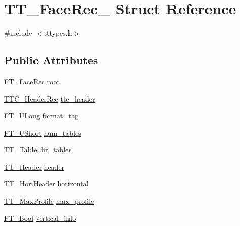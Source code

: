 \hypertarget{struct_t_t___face_rec__}{\section{T\-T\-\_\-\-Face\-Rec\-\_\- Struct Reference}
\label{struct_t_t___face_rec__}
}


{\ttfamily \#include $<$tttypes.\-h$>$}

\subsection*{Public Attributes}
\begin{DoxyCompactItemize}
\item 
\hyperlink{freetype_8h_a530156fe5441077746e672987881526c}{F\-T\-\_\-\-Face\-Rec} \hyperlink{struct_t_t___face_rec___ab07a1f6ce2cffe73a5501fb33164ae74}{root}
\item 
\hyperlink{tttypes_8h_aa2e7aff63d651e99df0ad2cbd4917af4}{T\-T\-C\-\_\-\-Header\-Rec} \hyperlink{struct_t_t___face_rec___a9cde4ce9550411379eef0791afef8943}{ttc\-\_\-header}
\item 
\hyperlink{fttypes_8h_a4fac88bdba78eb76b505efa6e4fbf3f5}{F\-T\-\_\-\-U\-Long} \hyperlink{struct_t_t___face_rec___ae492c009d7c3dd1b7279f6596edb84af}{format\-\_\-tag}
\item 
\hyperlink{fttypes_8h_a937f6c17cf5ffd09086d8610c37b9f58}{F\-T\-\_\-\-U\-Short} \hyperlink{struct_t_t___face_rec___aa32df24e9bbbbc72117bfeb964028b6e}{num\-\_\-tables}
\item 
\hyperlink{tttypes_8h_af84325159c268817528e02bea95999e6}{T\-T\-\_\-\-Table} \hyperlink{struct_t_t___face_rec___ae4480c53c6414c74919fc99c9192adfe}{dir\-\_\-tables}
\item 
\hyperlink{tttables_8h_a13a96fabf0c90560cf7ce96ff81b5a78}{T\-T\-\_\-\-Header} \hyperlink{struct_t_t___face_rec___ac5fc04850d7b223029891601ed605b34}{header}
\item 
\hyperlink{tttables_8h_ae362296906740a6c8e790e63679601b2}{T\-T\-\_\-\-Hori\-Header} \hyperlink{struct_t_t___face_rec___a784d2ca39e9717da0661f5fd59dffc58}{horizontal}
\item 
\hyperlink{tttables_8h_a45befad229720f58d1126a0e78d6ae05}{T\-T\-\_\-\-Max\-Profile} \hyperlink{struct_t_t___face_rec___a1bacbea2875d5fda567a5f561773035d}{max\-\_\-profile}
\item 
\hyperlink{fttypes_8h_a1a832a256bb5a7e6e884afaa1a07f3ae}{F\-T\-\_\-\-Bool} \hyperlink{struct_t_t___face_rec___a43e1c7d3fd3f43ddd7b1bba243bf10bc}{vertical\-\_\-info}

\end{DoxyCompactItemize}
